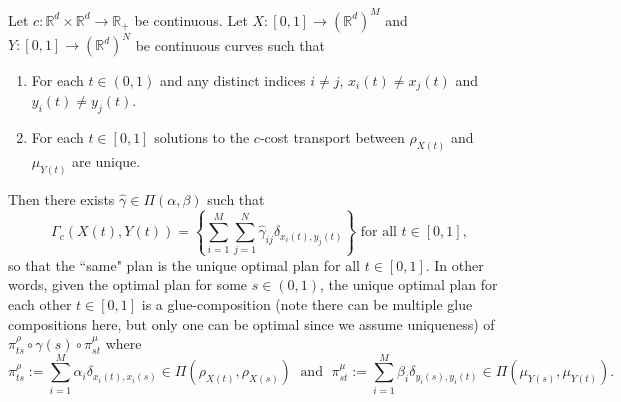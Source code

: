 \documentclass[10pt,a4paper]{amsart}
\newcommand{\R}{\mathbb{R}}
\begin{document}
\begin{theorem}
\label{thrm: structure of discrete plans new notation}
Let $c: \R^d \times \R^d \to \R_+$ be continuous. Let $X: [0, 1] \to (\R^d)^M$ and $Y : [0, 1] \to (\R^d)^N$ be continuous curves such that
\begin{enumerate}[label = (\roman*)]
    \item \label{enum: distinct points (0, 1)} For each $t \in (0, 1)$ and any distinct indices $i \neq j$, $x_i(t) \neq x_j(t)$ and $y_i(t) \neq y_j(t)$.
    \item \label{enum: unique solutions for each pb} For each $t \in [0, 1]$ solutions to the $c$-cost transport between $\rho_{X(t)}$ and $\mu_{Y(t)}$ are unique.
\end{enumerate}
Then there exists $\hat{\gamma} \in \Pi(\alpha, \beta)$ such that
\begin{equation*}
    \Gamma_c(X(t), Y(t)) = \left\{ \sum_{i = 1}^{M}\sum_{j=1}^N \hat\gamma_{ij} \delta_{x_i(t), y_j(t)} \right\} \text{ for all } t \in [0, 1],
\end{equation*}
so that the ``same" plan is the unique optimal plan for all $t \in [0, 1]$. In other words, given the optimal plan for some $s \in (0, 1)$, the unique optimal plan for each other $t \in [0, 1]$ is a glue-composition (note there can be multiple glue compositions here, but only one can be optimal since we assume uniqueness) of $ \pi_{ts}^\rho \circ \gamma(s) \circ \pi_{st}^\mu$ where
\begin{equation*}
    \pi_{ts}^\rho := \sum_{i = 1}^M \alpha_i \delta_{x_i(t), x_i(s)} \in \Pi(\rho_{X(t)}, \rho_{X(s)})\; \text{ and } \; \pi_{st}^\mu :=\sum_{i = 1}^M \beta_i \delta_{y_i(s), y_i(t)} \in \Pi(\mu_{Y(s)}, \mu_{Y(t)}).
\end{equation*}
\end{theorem}
\end{document}
